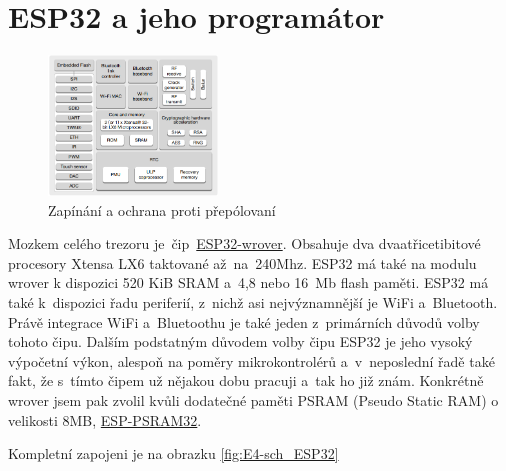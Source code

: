 \section{ESP32 a jeho programátor}

\begin{figure}
    \centering
    \includegraphics[width=0.4\textwidth]{kapitoly/obrazky/E4/ESP32/BlockDiagram.png}
    \caption{\label{fig:E4-ESP32-BlockDiagram}Zapínání a ochrana proti přepólovaní}
\end{figure}

Mozkem celého trezoru je~čip~\href{https://www.espressif.com/sites/default/files/documentation/esp32-wrover-b_datasheet_en.pdf}{ESP32-wrover}. 
Obsahuje dva dvaatřicetibitové procesory Xtensa LX6 taktované až~na~240Mhz. ESP32 má také na modulu wrover k dispozici 520 KiB SRAM 
a~4,8 nebo 16~Mb flash paměti. ESP32 má také k~dispozici řadu periferií, z~nichž asi nejvýznamnější je WiFi a~Bluetooth. Právě integrace 
WiFi a~Bluetoothu je také jeden z~primárních důvodů volby tohoto čipu. Dalším podstatným důvodem volby čipu ESP32 je jeho vysoký výpočetní výkon, 
alespoň na poměry mikrokontrolérů a~v~neposlední řadě také fakt, že s~tímto čipem už nějakou dobu pracuji a~tak ho již znám. Konkrétně wrover 
jsem pak zvolil kvůli dodatečné paměti PSRAM (Pseudo Static RAM) o velikosti 8MB, \href{http://gamma.spb.ru/images/pdf/esp-psram32_datasheet_en.pdf}{ESP-PSRAM32}.


Kompletní zapojeni je na obrazku \ref{fig:E4-sch_ESP32}

